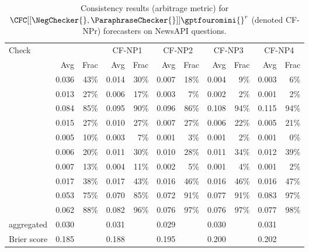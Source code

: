 {\begin{table}[htbp]
\caption{Consistency results (arbitrage metric) for $\CFC[[\NegChecker{},\ParaphraseChecker{}]]{\gptfouromini{}}^r$ (denoted CF-NPr) forecasters on NewsAPI questions.}
\begin{tabular}{lrrrrrrrrrr}
\toprule
Check & \multicolumn{2}{c}{\gptfouromini{}} & \multicolumn{2}{c}{CF-NP1} & \multicolumn{2}{c}{CF-NP2} & \multicolumn{2}{c}{CF-NP3} & \multicolumn{2}{c}{CF-NP4} \\
 & Avg & Frac & Avg & Frac & Avg & Frac & Avg & Frac & Avg & Frac \\
\midrule
\NegChecker{} & 0.036 & 43\% & 0.014 & 30\% & 0.007 & 18\% & 0.004 & 9\% & 0.003 & 6\% \\
\ParaphraseChecker{} & 0.013 & 27\% & 0.006 & 17\% & 0.003 & 7\% & 0.002 & 2\% & 0.001 & 2\% \\
\CondCondChecker{} & 0.084 & 85\% & 0.095 & 90\% & 0.096 & 86\% & 0.108 & 94\% & 0.115 & 94\% \\
\ExpectedEvidenceChecker{} & 0.015 & 27\% & 0.010 & 27\% & 0.007 & 27\% & 0.006 & 22\% & 0.005 & 21\% \\
\ConsequenceChecker{} & 0.005 & 10\% & 0.003 & 7\% & 0.001 & 3\% & 0.001 & 2\% & 0.001 & 0\% \\
\AndChecker{} & 0.006 & 20\% & 0.011 & 30\% & 0.010 & 28\% & 0.011 & 34\% & 0.012 & 39\% \\
\OrChecker{} & 0.007 & 13\% & 0.004 & 11\% & 0.002 & 5\% & 0.001 & 4\% & 0.001 & 2\% \\
\AndOrChecker{} & 0.017 & 38\% & 0.017 & 43\% & 0.016 & 46\% & 0.016 & 46\% & 0.016 & 47\% \\
\ButChecker{} & 0.053 & 75\% & 0.070 & 85\% & 0.072 & 91\% & 0.077 & 91\% & 0.083 & 97\% \\
\CondChecker{} & 0.062 & 88\% & 0.082 & 96\% & 0.076 & 97\% & 0.076 & 97\% & 0.077 & 98\% \\
aggregated & 0.030 &  & 0.031 &  & 0.029 &  & 0.030 &  & 0.031 &  \\
Brier score & 0.185 &  & 0.188 &  & 0.195 &  & 0.200 &  & 0.202 &  \\
\bottomrule
\end{tabular}
\label{tab:cf-npx}
\end{table}


}

